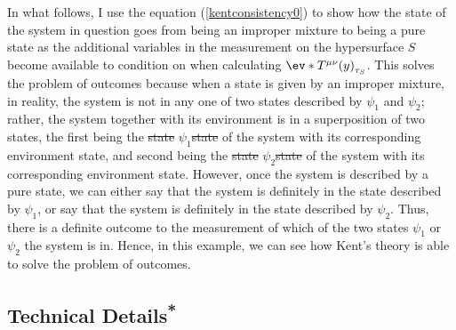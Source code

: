 \documentclass[12pt]{report}
\providecommand{\DIFadd}[1]{{\protect\color{blue}\uwave{#1}}} %
\providecommand{\DIFdel}[1]{{\protect\color{red}\sout{#1}}}                      %
\providecommand{\DIFaddbegin}{} %
\providecommand{\DIFaddend}{} %
\providecommand{\DIFdelbegin}{} %
\providecommand{\DIFdelend}{} %
\begin{document}
In what follows, I use the equation (\ref{kentconsistency0}) to show how the state of the system in question goes from being an improper mixture  to being a pure state as the additional variables in the measurement on the hypersurface $S$ become available to condition on when calculating $\ev*{T^{\mu\nu}(y)}_{\tau_S}$. This solves the problem of outcomes because when a state is given by an improper mixture, in reality, the system is not in any one of two states described by $\psi_1$ and $\psi_2$; rather, the system together with its environment is in a superposition of two states, the first being the \DIFdelbegin \DIFdel{state }\DIFdelend $\psi_1$\DIFdelbegin \DIFdel{state }\DIFdelend \DIFaddbegin \DIFadd{-state }\DIFaddend of the system with its corresponding environment state, and second being the \DIFdelbegin \DIFdel{state }\DIFdelend $\psi_2$\DIFdelbegin \DIFdel{state }\DIFdelend \DIFaddbegin \DIFadd{-state }\DIFaddend of the system with its corresponding environment state.  However, once the system is described by a pure state, we can either say that the system is definitely in the state described by $\psi_1$, or say that the system is definitely in the state described by $\psi_2$. Thus, there is a definite outcome to the measurement of which of the two states $\psi_1$ or $\psi_2$ the system is in. Hence, in this example, we can see how Kent's theory is able to solve the problem of outcomes.    

\subsection{Technical Details\textsuperscript{*}}
\end{document}
